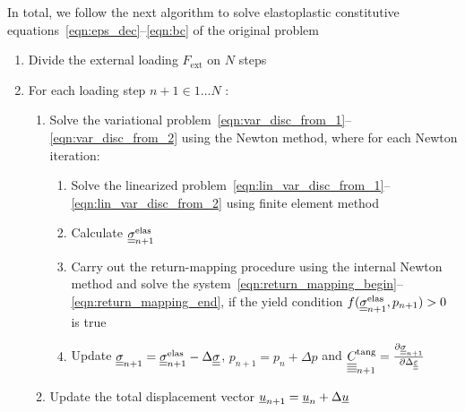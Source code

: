 \documentclass[12pt]{article}
\begin{document}
In total, we follow the next algorithm to solve elastoplastic constitutive equations~\eqref{eqn:eps_dec}--\eqref{eqn:bc} of the original problem
\begin{enumerate}
    \item Divide the external loading $F_\text{ext}$ on $N$ steps 
    \item For each loading step $n+1 \in {1 \dots N}$ :
    \begin{enumerate}
        \item Solve the variational problem~\eqref{eqn:var_disc_from_1}--\eqref{eqn:var_disc_from_2} using the Newton method, where for each Newton iteration:
        \begin{enumerate}
            \item Solve the linearized problem~\eqref{eqn:lin_var_disc_from_1}--\eqref{eqn:lin_var_disc_from_2} using finite element method
            \item Calculate $\underline{\underline{\sigma}}_{n+1}^{\text{elas}}$ 
            \item Carry out the return-mapping procedure using the internal Newton method and solve the system~\eqref{eqn:return_mapping_begin}--\eqref{eqn:return_mapping_end}, if the yield condition $f(\underline{\underline{\sigma}}_{n+1}^\text{elas}, p_{n+1}) > 0$ is true
            \item Update $\underline{\underline{\sigma}}_{n+1} = \underline{\underline{\sigma}}_{n+1}^{\text{elas}} - \Delta\underline{\underline{\sigma}}$, $p_{n+1} = p_n + \Delta p$ and $\underline{\underline{\underline{\underline{C_{}}}}}^\text{tang}_{n+1} = \frac{\partial \underline{\underline{\sigma}}_{n+1}}{\partial\Delta\underline{\underline{\varepsilon}}}$
        \end{enumerate}
        \item Update the total displacement vector $\underline{u}_{n+1} = \underline{u}_n + \Delta\underline{u}$
    \end{enumerate}
\end{enumerate}
\end{document}
